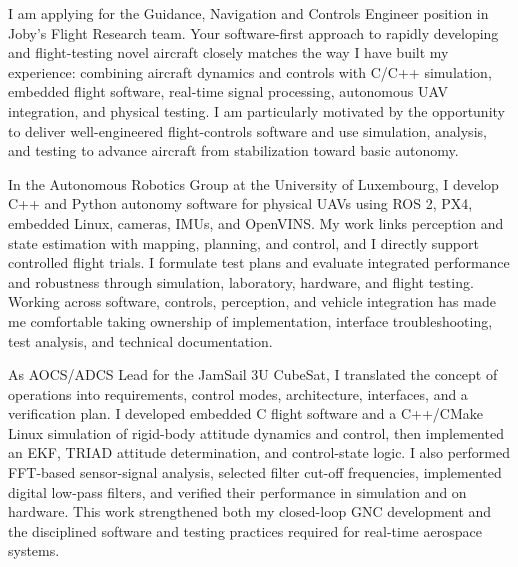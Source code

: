 \documentclass[10pt,a4paper]{article}
\newcommand{\BodySize}{9.25pt}
\newcommand{\BodyLineSize}{12.1pt}
\newcommand{\ParagraphSpacing}{10pt}       %
\newcommand{\LetterParagraph}[1]{%
    \noindent #1\par
    \addvspace{\ParagraphSpacing}%
}
\begin{document}
{\fontsize{\BodySize}{\BodyLineSize}\selectfont
    \color{CVDarkGray}

    \LetterParagraph{%
        I am applying for the Guidance, Navigation and Controls Engineer position in
        Joby's Flight Research team. Your software-first approach to rapidly developing
        and flight-testing novel aircraft closely matches the way I have built my
        experience: combining aircraft dynamics and controls with C/C++ simulation,
        embedded flight software, real-time signal processing, autonomous UAV
        integration, and physical testing. I am particularly motivated by the
        opportunity to deliver well-engineered flight-controls software and use
        simulation, analysis, and testing to advance aircraft from stabilization toward
        basic autonomy.%
    }

    \LetterParagraph{%
        In the Autonomous Robotics Group at the University of Luxembourg, I develop C++
        and Python autonomy software for physical UAVs using ROS 2, PX4, embedded Linux,
        cameras, IMUs, and OpenVINS. My work links perception and state estimation with
        mapping, planning, and control, and I directly support controlled flight trials.
        I formulate test plans and evaluate integrated performance and robustness through
        simulation, laboratory, hardware, and flight testing. Working across software,
        controls, perception, and vehicle integration has made me comfortable taking
        ownership of implementation, interface troubleshooting, test analysis, and
        technical documentation.%
    }

    \LetterParagraph{%
        As AOCS/ADCS Lead for the JamSail 3U CubeSat, I translated the concept of
        operations into requirements, control modes, architecture, interfaces, and a
        verification plan. I developed embedded C flight software and a C++/CMake Linux
        simulation of rigid-body attitude dynamics and control, then implemented an EKF,
        TRIAD attitude determination, and control-state logic. I also performed FFT-based
        sensor-signal analysis, selected filter cut-off frequencies, implemented digital
        low-pass filters, and verified their performance in simulation and on hardware.
        This work strengthened both my closed-loop GNC development and the disciplined
        software and testing practices required for real-time aerospace systems.%
    }

}
\end{document}
